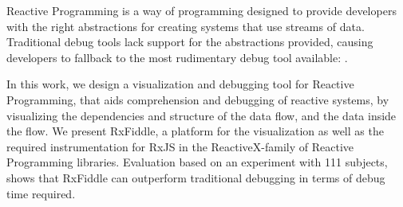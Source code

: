 Reactive Programming is a way of programming designed to provide
developers with the right abstractions for creating systems that use
streams of data.  Traditional debug tools lack support for the
abstractions provided, causing developers to fallback to the most
rudimentary debug tool available:  \printfdebugging{}.

In this work, we design a visualization and debugging tool for Reactive
Programming, that aids comprehension and debugging of reactive systems,
by visualizing the dependencies and structure of the data flow, and the
data inside the flow.  We present RxFiddle, a platform for the
visualization as well as the required instrumentation for RxJS in the
ReactiveX-family of Reactive Programming libraries.  Evaluation based on
an experiment with 111 subjects, shows that RxFiddle can outperform
traditional debugging in terms of debug time required.
